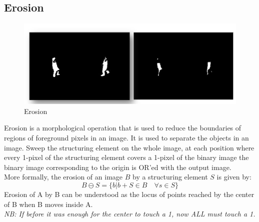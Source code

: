 \subsection{Erosion}
\begin{figure}[h]
    \centering
    \includegraphics[scale=0.5]{Figures/Erosion.png}
    \caption{Erosion}
    \label{fig:enter-label}
\end{figure}
Erosion is a morphological operation that is used to reduce the boundaries of regions of foreground pixels in an image. It is used to separate the objects in an image.
Sweep the structuring element on the whole image, at each position where every 1-pixel of the structuring element covers a 1-pixel of the binary image the binary image corresponding to the origin is OR’ed with the output image. 
\\More formally, the erosion of an image $B$ by a structuring element $S$ is given by:
\[
    B \ominus S = \{b | b + S \in B \quad \forall s \in S\} 
\]
Erosion of A by B can be understood as the locus of points reached by the center of B when B moves inside A.
\\
\textit{NB: If before it was enough for the center to touch a 1, now ALL must touch a 1.}
